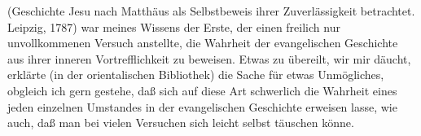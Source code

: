 \begin{RWanm} 
 (Geschichte Jesu nach Matthäus als Selbstbeweis ihrer Zuverlässigkeit betrachtet. Leipzig, 1787) war meines Wissens der Erste, der einen freilich nur unvollkommenen Versuch anstellte, die Wahrheit der evangelischen Geschichte aus ihrer inneren Vortrefflichkeit zu beweisen. Etwas zu übereilt, wir mir däucht, erklärte  (in der orientalischen Bibliothek) die Sache für etwas Unmögliches, obgleich ich gern gestehe, daß sich auf diese Art schwerlich die Wahrheit eines jeden einzelnen Umstandes in der evangelischen Geschichte erweisen lasse, wie auch, daß man bei vielen Versuchen sich leicht selbst täuschen könne.
\end{RWanm}

